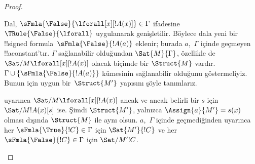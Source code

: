 \begin{proof}
\begin{enumerate}
{\item Dal, $\sFmla{\False}{\lforall[x][!A(x)]} \in \Gamma$ ifadesine
  $\TRule{\False}{\lforall}$ uygulanarak genişletilir. Böylece dala yeni bir
  !!{signed formula}~$\sFmla{\False}{!A(a)}$ eklenir; burada $a$,~$\Gamma$
  içinde geçmeyen !!a{constant}'tır. $\Gamma$ sağlanabilir olduğundan
  $\Sat{M}{\Gamma}$, özellikle de
  $\Sat/{M}{\lforall[x][!A(x)]}$ olacak biçimde bir $\Struct{M}$ vardır.
  $\Gamma \cup \{\sFmla{\False}{!A(a)}\}$ kümesinin sağlanabilir olduğunu
  göstermeliyiz. Bunun için uygun bir~$\Struct{M'}$ yapısını şöyle tanımlarız.

   uyarınca
  $\Sat/{M}{\lforall[x][!A(x)]}$ ancak ve ancak belirli bir $s$ için
  $\Sat/{M}{!A(x)}[s]$ ise. Şimdi $\Struct{M'}$, yalnızca
  $\Assign{a}{M'} = s(x)$ olması dışında $\Struct{M}$ ile aynı olsun.
  $a$,~$\Gamma$ içinde geçmediğinden
   uyarınca her
  $\sFmla{\True}{!C} \in \Gamma$ için $\Sat{M'}{!C}$ ve her
  $\sFmla{\False}{!C} \in \Gamma$ için $\Sat/{M'}{!C}$.

}
\end{enumerate}
\end{proof}

